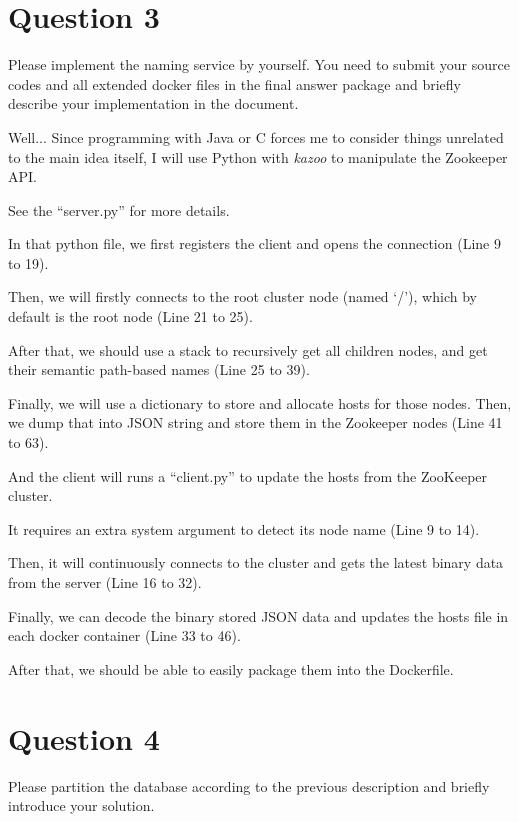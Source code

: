 \documentclass[11pt, oneside]{article}   	%
\begin{document}
\section*{Question 3}
Please implement the naming service by yourself. You need to submit your source codes and all extended docker files in the final answer package and briefly describe your implementation in the document.
\newline

Well... Since programming with Java or C forces me to consider things unrelated to the main idea itself, I will use Python with \textit{kazoo} to manipulate the Zookeeper API.
\newline

See the ``server.py'' for more details.

In that python file, we first registers the client and opens the connection (Line 9 to 19).

Then, we will firstly connects to the root cluster node (named `/'), which by default is the root node (Line 21 to 25).

After that, we should use a stack to recursively get all children nodes, and get their semantic path-based names (Line 25 to 39).

Finally, we will use a dictionary to store and allocate hosts for those nodes. Then, we dump that into JSON string and store them in the Zookeeper nodes (Line 41 to 63).
\newline

And the client will runs a ``client.py'' to update the hosts from the ZooKeeper cluster.

It requires an extra system argument to detect its node name (Line 9 to 14).

Then, it will continuously connects to the cluster and gets the latest binary data from the server (Line 16 to 32).

Finally, we can decode the binary stored JSON data and updates the hosts file in each docker container (Line 33 to 46).
\newline

After that, we should be able to easily package them into the Dockerfile.

\section*{Question 4}
Please partition the database according to the previous description and briefly introduce your solution.
\newline
\end{document}
